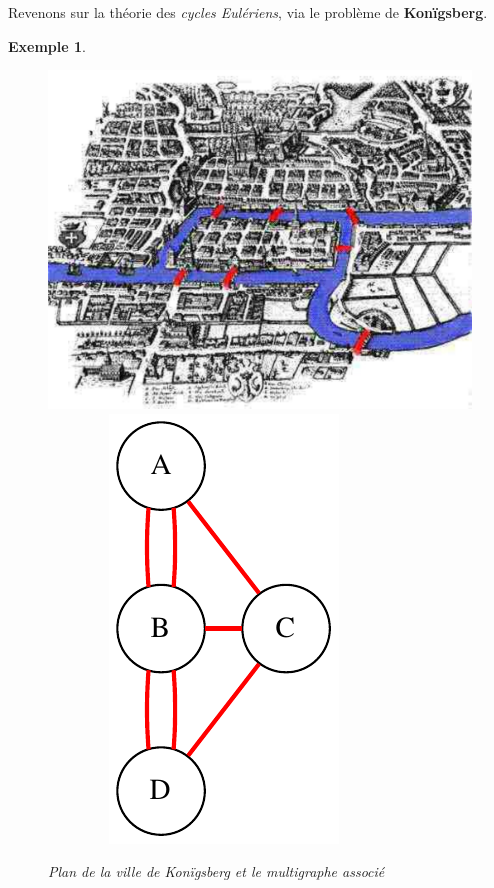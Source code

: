 \documentclass{article}
\newtheorem{exemple}{Exemple}[section]
\begin{document}
\begin{sffamily}
\newpage

Revenons sur la théorie des \textit{cycles Eulériens}, via le problème de \textbf{Konïgsberg}.
\begin{exemple}$ $ \\
\begin{figure}[h!]
    \begin{center}
    \includegraphics[scale=0.4]{konigsberg.pdf}$\qquad\qquad$
    \includegraphics[scale=0.5]{konig.pdf}
    \caption{Plan de la ville de Konïgsberg et le multigraphe associé}
    \end{center}	
\end{figure}


\end{exemple}
\end{sffamily}
\end{document}
